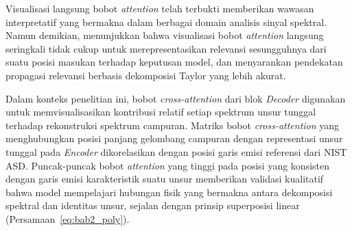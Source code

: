 Visualisasi langsung bobot \textit{attention} telah terbukti memberikan wawasan interpretatif yang bermakna dalam berbagai domain analisis sinyal spektral. Namun demikian, \citet{chefer_transformer_2021} menunjukkan bahwa visualisasi bobot \textit{attention} langsung seringkali tidak cukup untuk merepresentasikan relevansi sesungguhnya dari suatu posisi masukan terhadap keputusan model, dan menyarankan pendekatan propagasi relevansi berbasis dekomposisi Taylor yang lebih akurat.

Dalam konteks penelitian ini, bobot \textit{cross-attention} dari blok \textit{Decoder} digunakan untuk memvisualisasikan kontribusi relatif setiap spektrum unsur tunggal terhadap rekonstruksi spektrum campuran. Matriks bobot \textit{cross-attention} yang menghubungkan posisi panjang gelombang campuran dengan representasi unsur tunggal pada \textit{Encoder} dikorelasikan dengan posisi garis emisi referensi dari NIST ASD. Puncak-puncak bobot \textit{attention} yang tinggi pada posisi yang konsisten dengan garis emisi karakteristik suatu unsur memberikan validasi kualitatif bahwa model mempelajari hubungan fisik yang bermakna antara dekomposisi spektral dan identitas unsur, sejalan dengan prinsip superposisi linear (Persamaan~\ref{eq:bab2_poly}).